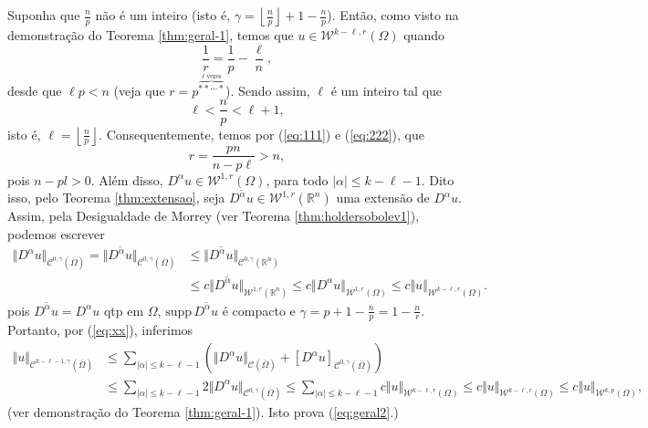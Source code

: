 \documentclass[a4paper, 11pt]{book}
\theoremstyle{definition}
\newcommand{\bR}{\mathbb{R}}
\newcommand{\cC}{\mathcal{C}}
\newcommand{\cW}{\mathcal{W}}
\newcommand{\supp}{\mathrm{supp}\,}
\begin{document}
\begin{prf}
    Suponha que $\frac{n}{p}$ não é um inteiro (isto é, $\gamma = \left\lfloor \frac{n}{p} \right\rfloor + 1 - \frac{n}{p}$). Então, como visto na demonstração do Teorema \ref{thm:geral-1}, temos que $u \in \cW^{k-\ell,r}(\Omega)$ quando
    \begin{equation} \label{eq:111}
        \frac{1}{r} = \frac{1}{p} - \frac{\ell}{n},
    \end{equation}
    desde que $\ell p < n$ (veja que $r = p^{\overbrace{**\cdots*}^{\ell \text{ vezes}}}$). Sendo assim, $\ell$ é um inteiro tal que
    \begin{equation} \label{eq:222}
        \ell < \frac{n}{p} < \ell + 1,
    \end{equation}
    isto é, $\ell = \left\lfloor \frac{n}{p} \right\rfloor$.
    Consequentemente, temos por (\ref{eq:111}) e (\ref{eq:222}), que
    \begin{equation}
        r = \frac{pn}{n-p\ell} > n,
    \end{equation}
    pois $n - pl > 0$. Além disso, $D^\alpha u \in \cW^{1,r}(\Omega)$, para todo $|\alpha| \leqslant k - \ell -1$. Dito isso, pelo Teorema \ref{thm:extensao}, seja $\overline{D^\alpha u} \in \cW^{1,r}(\bR^n)$ uma extensão de $D^\alpha u$.
    Assim, pela Desigualdade de Morrey (ver Teorema \ref{thm:holdersobolev1}), podemos escrever
    \begin{equation} \label{eq:xx}
        \begin{aligned}
            \Vert D^\alpha u \Vert_{\cC^{0,\gamma}(\overline\Omega)} = \Vert \overline{D^\alpha u} \Vert_{\cC^{0,\gamma}(\overline\Omega)} &\leqslant \Vert \overline{D^\alpha u} \Vert_{\cC^{0,\gamma}(\bR^n)} \\
            &\leqslant c \Vert \overline{D^\alpha u} \Vert_{\cW^{1,r}(\bR^n)}\leqslant c \Vert D^\alpha u \Vert_{\cW^{1,r}(\Omega)} \leqslant c \Vert u \Vert_{\cW^{k-\ell,r}(\Omega)}.
        \end{aligned}
    \end{equation}
    pois $\overline{D^\alpha u} = D^\alpha u$ qtp em $\Omega$, $\supp \overline{D^\alpha u}$ é compacto e $\gamma = p + 1 - \frac{n}{p} = 1 - \frac{n}{r}$.
    Portanto, por (\ref{eq:xx}), inferimos
    \[
        \begin{aligned}
            \Vert u \Vert_{\cC^{k-\ell-1,\gamma}(\overline\Omega)} &\leqslant \sum_{|\alpha| \leqslant k - \ell - 1} \left( \Vert D^\alpha u \Vert_{\cC(\overline\Omega)} + [D^\alpha u]_{\cC^{0,\gamma}(\overline\Omega)} \right)\\
            &\leqslant \sum_{|\alpha| \leqslant k - \ell - 1} \!\!\!2 \Vert D^\alpha u  \Vert_{\cC^{0,\gamma}(\overline\Omega)} \leqslant \sum_{|\alpha| \leqslant k - \ell - 1} \!\!\!c \Vert u  \Vert_{\cW^{k-\ell,r}(\Omega)} \leqslant c \Vert u \Vert_{\cW^{k-\ell,r} (\Omega)} \leqslant c \Vert u \Vert_{\cW^{k,p}(\Omega)},
        \end{aligned}
    \]
    (ver demonstração do Teorema \ref{thm:geral-1}). Isto prova (\ref{eq:geral2}.)


\end{prf}
\end{document}
